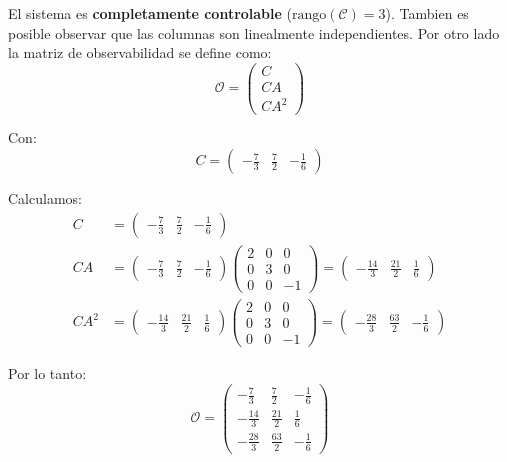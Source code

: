 \documentclass[
  11pt,
  letterpaper,
   addpoints,
   answers
  ]{exam}
\begin{document}
\begin{questions}
\begin{parts}
\begin{solution}
        El sistema es \textbf{completamente controlable} ($\text{rango}(\mathcal{C}) = 3$). Tambien es posible observar que las columnas son linealmente independientes. Por otro lado la matriz de observabilidad se define como:
        \begin{equation}
            \mathcal{O} = \begin{pmatrix} C\\ CA\\ CA^2 \end{pmatrix}
        \end{equation}

        Con:
        \begin{equation}
            C = \begin{pmatrix} -\frac{7}{3} & \frac{7}{2} & -\frac{1}{6} \end{pmatrix}
        \end{equation}

        Calculamos:
        \begin{align}
            C &= \begin{pmatrix} -\frac{7}{3} & \frac{7}{2} & -\frac{1}{6} \end{pmatrix}\\[6pt]
            CA &= \begin{pmatrix} -\frac{7}{3} & \frac{7}{2} & -\frac{1}{6} \end{pmatrix} \begin{pmatrix} 2 & 0 & 0\\ 0 & 3 & 0\\ 0 & 0 & -1 \end{pmatrix} = \begin{pmatrix} -\frac{14}{3} & \frac{21}{2} & \frac{1}{6} \end{pmatrix}\\[6pt]
            CA^2 &= \begin{pmatrix} -\frac{14}{3} & \frac{21}{2} & \frac{1}{6} \end{pmatrix} \begin{pmatrix} 2 & 0 & 0\\ 0 & 3 & 0\\ 0 & 0 & -1 \end{pmatrix} = \begin{pmatrix} -\frac{28}{3} & \frac{63}{2} & -\frac{1}{6} \end{pmatrix}
        \end{align}

        Por lo tanto:
        \begin{equation}
            \mathcal{O} = \begin{pmatrix} -\frac{7}{3} & \frac{7}{2} & -\frac{1}{6}\\ -\frac{14}{3} & \frac{21}{2} & \frac{1}{6}\\ -\frac{28}{3} & \frac{63}{2} & -\frac{1}{6} \end{pmatrix}
        \end{equation}


\end{solution}
\end{parts}
\end{questions}
\end{document}
